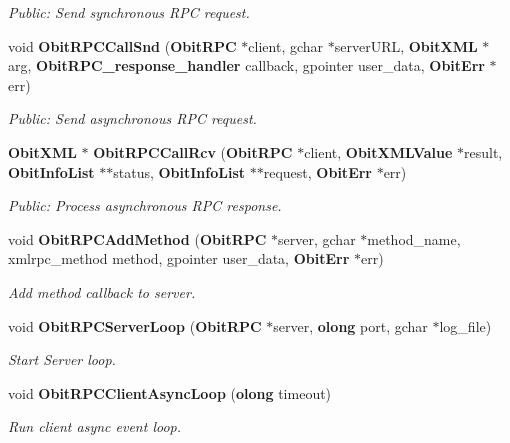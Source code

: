 \begin{CompactItemize}
\begin{CompactList}\small\item\em Public: Send synchronous RPC request. \item\end{CompactList}\item 
void {\bf Obit\-RPCCall\-Snd} ({\bf Obit\-RPC} $\ast$client, gchar $\ast$server\-URL, {\bf Obit\-XML} $\ast$arg, {\bf Obit\-RPC\_\-response\_\-handler} callback, gpointer user\_\-data, {\bf Obit\-Err} $\ast$err)
\begin{CompactList}\small\item\em Public: Send asynchronous RPC request. \item\end{CompactList}\item 
{\bf Obit\-XML} $\ast$ {\bf Obit\-RPCCall\-Rcv} ({\bf Obit\-RPC} $\ast$client, {\bf Obit\-XMLValue} $\ast$result, {\bf Obit\-Info\-List} $\ast$$\ast$status, {\bf Obit\-Info\-List} $\ast$$\ast$request, {\bf Obit\-Err} $\ast$err)
\begin{CompactList}\small\item\em Public: Process asynchronous RPC response. \item\end{CompactList}\item 
void {\bf Obit\-RPCAdd\-Method} ({\bf Obit\-RPC} $\ast$server, gchar $\ast$method\_\-name, xmlrpc\_\-method method, gpointer user\_\-data, {\bf Obit\-Err} $\ast$err)
\begin{CompactList}\small\item\em Add method callback to server. \item\end{CompactList}\item 
void {\bf Obit\-RPCServer\-Loop} ({\bf Obit\-RPC} $\ast$server, {\bf olong} port, gchar $\ast$log\_\-file)
\begin{CompactList}\small\item\em Start Server loop. \item\end{CompactList}\item 
void {\bf Obit\-RPCClient\-Async\-Loop} ({\bf olong} timeout)
\begin{CompactList}\small\item\em Run client async event loop. \item\end{CompactList}\end{CompactItemize}


